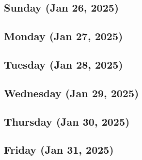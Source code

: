 \subsection*{Sunday (Jan 26, 2025)}
\subsection*{Monday (Jan 27, 2025)}
\subsection*{Tuesday (Jan 28, 2025)}
\subsection*{Wednesday (Jan 29, 2025)}
\subsection*{Thursday (Jan 30, 2025)}
\subsection*{Friday (Jan 31, 2025)}


\newpage
\begin{spacing}{1.0}
\renewcommand{\bibname}{\bf{References}}


\end{spacing}